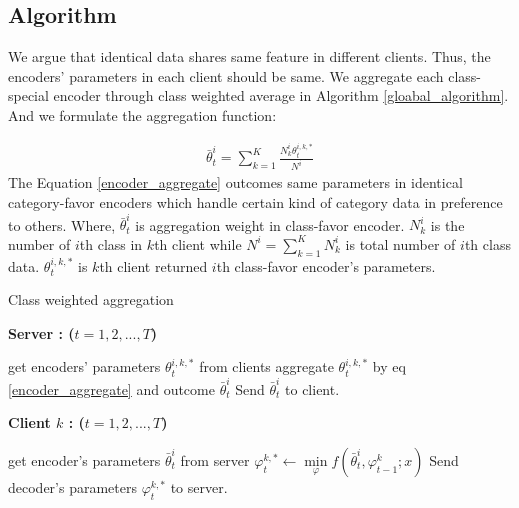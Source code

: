 \documentclass[journal]{IEEEtran}
\begin{document}
\subsection{Algorithm}
We argue that identical data shares same feature in different clients. Thus, the encoders' parameters in each client should be same. We aggregate each class-special encoder through class weighted average in Algorithm \ref{gloabal_algorithm}. And we formulate the aggregation function:

\begin{align}\label{encoder_aggregate}
	\bar{\theta}^{i}_{t}=\sum_{k=1}^{K}\frac{N^{i}_{k}\theta^{i,k,*}_{t}}{N^{i}}
\end{align}
The Equation \ref{encoder_aggregate} outcomes same parameters in identical category-favor encoders which handle certain kind of category data in preference to others. Where, $\bar{\theta}^{i}_{t}$ is aggregation weight in class-favor encoder. $N^{i}_{k}$ is the number of $i$th class in $k$th client while $N^{i}=\sum_{k=1}^{K}N^{i}_{k}$ is total number of $i$th class data. $\theta^{i,k,*}_{t}$ is $k$th client returned $i$th class-favor encoder's parameters. 

\begin{algorithm}
	\caption{Class weighted aggregation}\label{gloabal_algorithm}
	
	\textbf{Server : ($t=1,2,...,T $)} 
	\begin{algorithmic}[1]
		\State get encoders' parameters $\theta^{i,k,*}_{t}$ from clients
		\State aggregate $\theta^{i,k,*}_{t}$ by eq \ref{encoder_aggregate} and outcome $\bar{\theta}^{i}_{t}$
		\State Send  $\bar{\theta}^{i}_{t}$ to client.
		\EndWhile
	\end{algorithmic}
	
	\textbf{Client $k$ : ($t=1,2,...,T $)}
	
	\begin{algorithmic}[1]
		\State get encoder's parameters $\bar{\theta}^{i}_{t}$ from server
		\State $\varphi^{k,*}_{t} \gets \min\limits_{\varphi}f(\bar{\theta}^{i}_{t},\varphi^{k}_{t-1};x) $
		\State Send decoder's parameters $\varphi^{k,*}_{t}$ to server.
		\EndWhile
	\end{algorithmic}
\end{algorithm}
\end{document}
